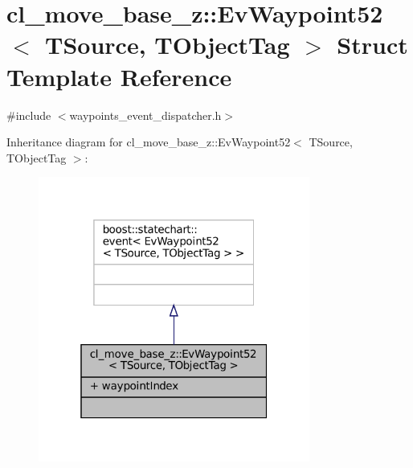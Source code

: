 \hypertarget{structcl__move__base__z_1_1EvWaypoint52}{}\section{cl\+\_\+move\+\_\+base\+\_\+z\+:\+:Ev\+Waypoint52$<$ T\+Source, T\+Object\+Tag $>$ Struct Template Reference}
\label{structcl__move__base__z_1_1EvWaypoint52}


{\ttfamily \#include $<$waypoints\+\_\+event\+\_\+dispatcher.\+h$>$}



Inheritance diagram for cl\+\_\+move\+\_\+base\+\_\+z\+:\+:Ev\+Waypoint52$<$ T\+Source, T\+Object\+Tag $>$\+:
\nopagebreak
\begin{figure}[H]
\begin{center}
\leavevmode
\includegraphics[width=253pt]{structcl__move__base__z_1_1EvWaypoint52__inherit__graph}
\end{center}
\end{figure}


